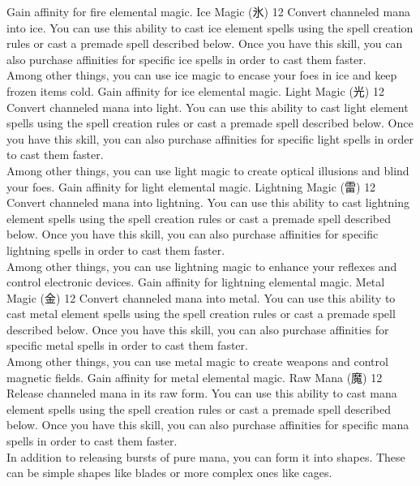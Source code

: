 \begin{pathele}
{Gain affinity for fire elemental magic.}
\skilldescription
{Ice Magic {\jpfont(氷)}}
{12}
{Convert channeled mana into ice. You can use this ability to cast ice element spells using the spell creation rules or cast a premade spell described below. Once you have this skill, you can also purchase affinities for specific ice spells in order to cast them faster.\\Among other things, you can use ice magic to encase your foes in ice and keep frozen items cold.}
{Gain affinity for ice elemental magic.}
\skilldescription
{Light Magic {\jpfont(光)}}
{12}
{Convert channeled mana into light. You can use this ability to cast light element spells using the spell creation rules or cast a premade spell described below. Once you have this skill, you can also purchase affinities for specific light spells in order to cast them faster.\\Among other things, you can use light magic to create optical illusions and blind your foes.}
{Gain affinity for light elemental magic.}
\skilldescription
{Lightning Magic {\jpfont(雷)}}
{12}
{Convert channeled mana into lightning. You can use this ability to cast lightning element spells using the spell creation rules or cast a premade spell described below. Once you have this skill, you can also purchase affinities for specific lightning spells in order to cast them faster.\\Among other things, you can use lightning magic to enhance your reflexes and control electronic devices.}
{Gain affinity for lightning elemental magic.}
\skilldescription
{Metal Magic {\jpfont(金)}}
{12}
{Convert channeled mana into metal. You can use this ability to cast metal element spells using the spell creation rules or cast a premade spell described below. Once you have this skill, you can also purchase affinities for specific metal spells in order to cast them faster.\\Among other things, you can use metal magic to create weapons and control magnetic fields.}
{Gain affinity for metal elemental magic.}
\skilldescription
{Raw Mana {\jpfont(魔)}}
{12}
{Release channeled mana in its raw form. You can use this ability to cast mana element spells using the spell creation rules or cast a premade spell described below. Once you have this skill, you can also purchase affinities for specific mana spells in order to cast them faster.\\In addition to releasing bursts of pure mana, you can form it into shapes. These can be simple shapes like blades or more complex ones like cages.}

\end{pathele}

